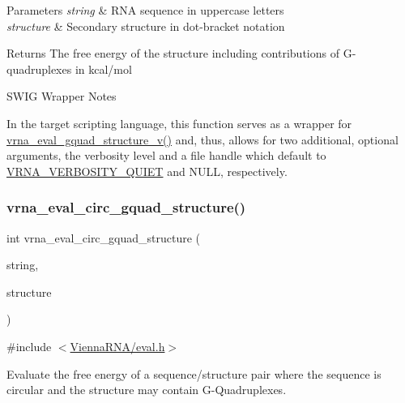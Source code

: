 \begin{DoxyParams}{Parameters}
{\em string} & R\+NA sequence in uppercase letters \\
\hline
{\em structure} & Secondary structure in dot-\/bracket notation \\
\hline
\end{DoxyParams}
\begin{DoxyReturn}{Returns}
The free energy of the structure including contributions of G-\/quadruplexes in kcal/mol
\end{DoxyReturn}
\begin{DoxyRefDesc}{S\+W\+I\+G Wrapper Notes}
\item[\hyperlink{wrappers__wrappers000043}{S\+W\+I\+G Wrapper Notes}]In the target scripting language, this function serves as a wrapper for \hyperlink{group__eval_gaeaa2bdbc1b5d78c667e735fbdff87fff}{vrna\+\_\+eval\+\_\+gquad\+\_\+structure\+\_\+v()} and, thus, allows for two additional, optional arguments, the verbosity level and a file handle which default to \hyperlink{group__eval_gaf4afe19780b61b4962c613bde324128b}{V\+R\+N\+A\+\_\+\+V\+E\+R\+B\+O\+S\+I\+T\+Y\+\_\+\+Q\+U\+I\+ET} and N\+U\+LL, respectively. \end{DoxyRefDesc}
\mbox{\label{group__eval_ga9dba2fc5d7e6ad1359a7c2f350589c0e}} 
\subsubsection{\texorpdfstring{vrna\+\_\+eval\+\_\+circ\+\_\+gquad\+\_\+structure()}{vrna\_eval\_circ\_gquad\_structure()}}
{\footnotesize\ttfamily int vrna\+\_\+eval\+\_\+circ\+\_\+gquad\+\_\+structure (\begin{DoxyParamCaption}\item[{const char $\ast$}]{string,  }\item[{const char $\ast$}]{structure }\end{DoxyParamCaption})}



{\ttfamily \#include $<$\hyperlink{eval_8h}{Vienna\+R\+N\+A/eval.\+h}$>$}



Evaluate the free energy of a sequence/structure pair where the sequence is circular and the structure may contain G-\/\+Quadruplexes. 

